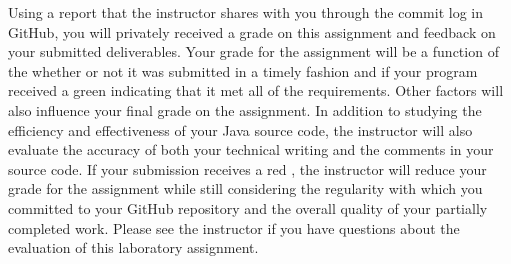 \documentclass[11pt]{article}
\newcommand{\checkmark}{\ding{51}}
\newcommand{\naughtmark}{\ding{55}}
\begin{document}
Using a report that the instructor shares with you through the commit log in GitHub, you will privately received a grade
on this assignment and feedback on your submitted deliverables. Your grade for the assignment will be a function of the
whether or not it was submitted in a timely fashion and if your program received a green \checkmark{} indicating that it
met all of the requirements. Other factors will also influence your final grade on the assignment. In addition to
studying the efficiency and effectiveness of your Java source code, the instructor will also evaluate the accuracy of
both your technical writing and the comments in your source code. If your submission receives a red \naughtmark{}, the
instructor will reduce your grade for the assignment while still considering the regularity with which you committed to
your GitHub repository and the overall quality of your partially completed work. Please see the instructor if you have
questions about the evaluation of this laboratory assignment.


\end{document}
